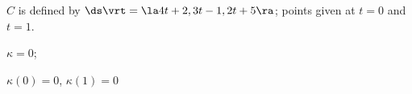 {$C$ is defined by $\ds \vrt = \la 4t+2,3t-1,2t+5\ra $; points given at $t=0$ and $t=1$. 
}
{$\kappa = 0$;

$\kappa(0) = 0$, $\kappa(1) = 0$
}